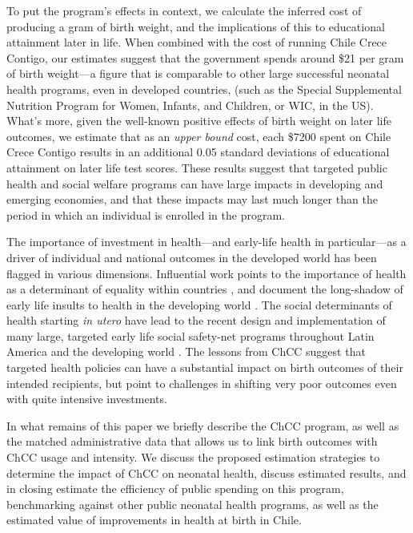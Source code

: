 \documentclass[12pt]{article}
\begin{document}
\begin{spacing}{1.4}
To put the program's effects in context, we calculate the inferred cost
of producing a gram of birth weight, and the implications of this to
educational attainment later in life.  When combined with the cost of
running Chile Crece Contigo, our estimates suggest that the government
spends around \$21 per gram of birth weight---a figure that is comparable
to other large successful neonatal health programs, even in developed
countries, 
(such as the Special Supplemental Nutrition Program for Women, Infants,
and Children, or WIC, in the US).  What's more, given the well-known
positive effects of birth weight on later life outcomes, we estimate that
as an \emph{upper bound} cost, each \$7200 spent on Chile Crece Contigo
results in an additional 0.05 standard deviations of educational attainment
on later life test scores.  These results suggest that targeted public
health and social welfare programs can have large impacts in developing
and emerging economies, and that these impacts may last much longer than
the period in which an individual is enrolled in the program.

The importance of investment in health---and early-life health in
particular---as a driver of individual and national outcomes in the
developed world has been flagged in various dimensions.  Influential
work points to the importance of health as a determinant of equality
within countries \citep{Deaton2003}, and document the long-shadow of
early life insults to health in the developing world
\citep{CurrieVogl2012}.   The social determinants of health starting
\emph{in utero} have lead to the recent design and implementation of
many large, targeted early life social safety-net programs throughout
Latin America and the developing world \citep{Monteiroetal2015}.
The lessons from ChCC suggest that targeted health policies can
have a substantial impact on birth outcomes of their intended
recipients, but point to challenges in shifting very poor outcomes
even with quite intensive investments.

In what remains of this paper we briefly describe the ChCC program,
as well as the matched administrative data that allows us to link
birth outcomes with ChCC usage and intensity.  We discuss the proposed
estimation strategies to determine the impact of ChCC on neonatal health,
discuss estimated results, and in closing estimate the efficiency of
public spending on this program, benchmarking against other public
neonatal health programs, as well as the estimated value of improvements
in health at birth in Chile.


\end{spacing}
\end{document}
